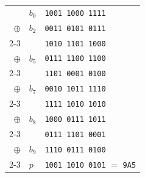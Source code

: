 \begin{tabular}{@{}r@{\;\;}l@{\;\;}l@{}}
 & $b_{0}$ & \texttt{1001\,1000\,1111} \\
$\oplus$ & $b_{2}$ & \texttt{0011\,0101\,0111} \\
\cmidrule(lr){2-3}
 & & \texttt{1010\,1101\,1000} \\
$\oplus$ & $b_{5}$ & \texttt{0111\,1100\,1100} \\
\cmidrule(lr){2-3}
 & & \texttt{1101\,0001\,0100} \\
$\oplus$ & $b_{7}$ & \texttt{0010\,1011\,1110} \\
\cmidrule(lr){2-3}
 & & \texttt{1111\,1010\,1010} \\
$\oplus$ & $b_{8}$ & \texttt{1000\,0111\,1011} \\
\cmidrule(lr){2-3}
 & & \texttt{0111\,1101\,0001} \\
$\oplus$ & $b_{9}$ & \texttt{1110\,0111\,0100} \\
\cmidrule(lr){2-3}
 & $p$ & \texttt{1001\,1010\,0101} \;$=$\; \texttt{9A5} \\
\end{tabular}
